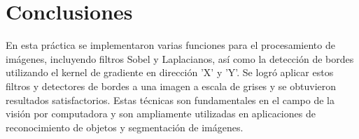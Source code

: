 \documentclass{article}
\begin{document}
    \clearpage
    \section{Conclusiones}
    En esta práctica se implementaron varias funciones para el procesamiento de imágenes, incluyendo filtros Sobel y Laplacianos,
    así como la detección de bordes utilizando el kernel de gradiente en dirección 'X' y 'Y'.
    Se logró aplicar estos filtros y detectores de bordes a una imagen a escala de grises y se obtuvieron resultados satisfactorios.
    Estas técnicas son fundamentales en el campo de la visión por computadora y son ampliamente utilizadas en aplicaciones de reconocimiento de objetos y segmentación de imágenes.
    
\end{document}
